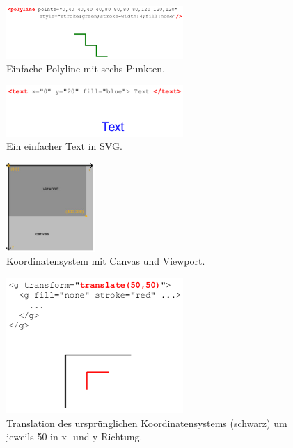 \begin{figure}[h]\centering
\includegraphics[width=0.6\textwidth]{pictures/polyline.png}
\caption{Einfache Polyline mit sechs Punkten.}
\label{fig:polyl}
\end{figure}
\begin{figure}[h]\centering
\includegraphics[width=0.6\textwidth]{pictures/text.png}
\caption{Ein einfacher Text in SVG.}
\label{fig:text}
\end{figure}
\begin{figure}[h]\centering
\includegraphics[width=0.3\textwidth]{pictures/koordinatensystem.jpg}
\caption{Koordinatensystem mit Canvas und Viewport.}
\label{fig:koor}
\end{figure}
\begin{figure}[h]\centering
\includegraphics[width=0.6\textwidth]{pictures/transla.png}
\caption{Translation des ursprünglichen Koordinatensystems (schwarz) um jeweils 50 in x- und y-Richtung.}
\label{fig:trans}
\end{figure}
